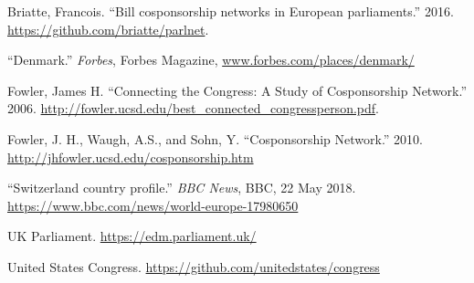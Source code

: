 \documentclass[12pt]{article}
\begin{document}
\begin{multicols*}{2}
\begin{thebibliography}{9}
 Briatte, Francois. ``Bill cosponsorship networks in European parliaments.'' 2016. \url{https://github.com/briatte/parlnet}.

 ``Denmark.'' \emph{Forbes}, Forbes Magazine, \url{www.forbes.com/places/denmark/}

 Fowler, James H. ``Connecting the Congress: A Study of Cosponsorship Network.'' 2006. \url{http://fowler.ucsd.edu/best_connected_congressperson.pdf}.

 Fowler, J. H., Waugh, A.S., and Sohn, Y. ``Cosponsorship Network.'' 2010. \url {http://jhfowler.ucsd.edu/cosponsorship.htm}

 ``Switzerland country profile.'' \emph{BBC News}, BBC, 22 May 2018. \url{https://www.bbc.com/news/world-europe-17980650}

 UK Parliament. \url{https://edm.parliament.uk/}

 United States Congress. \url{https://github.com/unitedstates/congress}
\end{thebibliography}


\end{multicols*}
\end{document}
